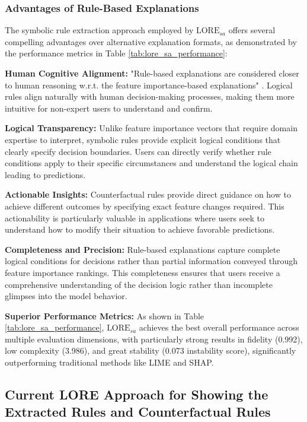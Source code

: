 \subsubsection{Advantages of Rule-Based Explanations}
The symbolic rule extraction approach employed by $\text{LORE}_{sa}$ offers several compelling advantages over alternative explanation formats, as demonstrated by the performance metrics in Table \ref{tab:lore_sa_performance}:

\textbf{Human Cognitive Alignment:} "Rule-based explanations are considered closer to human reasoning w.r.t. the feature importance-based explanations" \cite{bodria2023benchmarking}. Logical rules align naturally with human decision-making processes, making them more intuitive for non-expert users to understand and confirm.

\textbf{Logical Transparency:} Unlike feature importance vectors that require domain expertise to interpret, symbolic rules provide explicit logical conditions that clearly specify decision boundaries. Users can directly verify whether rule conditions apply to their specific circumstances and understand the logical chain leading to predictions.

\textbf{Actionable Insights:} Counterfactual rules provide direct guidance on how to achieve different outcomes by specifying exact feature changes required. This actionability is particularly valuable in applications where users seek to understand how to modify their situation to achieve favorable predictions.

\textbf{Completeness and Precision:} Rule-based explanations capture complete logical conditions for decisions rather than partial information conveyed through feature importance rankings. This completeness ensures that users receive a comprehensive understanding of the decision logic rather than incomplete glimpses into the model behavior.

\textbf{Superior Performance Metrics:} As shown in Table \ref{tab:lore_sa_performance}, $\text{LORE}_{sa}$ achieves the best overall performance across multiple evaluation dimensions, with particularly strong results in fidelity (0.992), low complexity (3.986), and great stability (0.073 instability score), significantly outperforming traditional methods like LIME and SHAP.

\subsection{Current LORE Approach for Showing the Extracted Rules and Counterfactual Rules}\label{subsec:currentLOREapproach}


